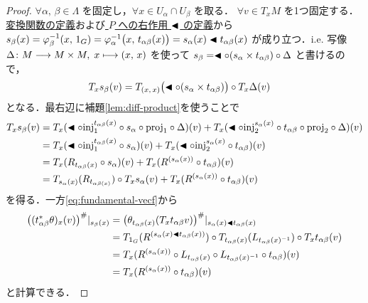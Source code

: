 \documentclass[geometry_main]{subfiles}
\begin{document}
\begin{proof}
    $\forall \alpha,\, \beta \in \Lambda$ を固定し，$\forall x \in U_\alpha \cap U_\beta$ を取る．
    $\forall v \in T_x M$ を1つ固定する．
    \hyperref[def.fiber-1]{変換関数の定義}および\hyperref[prop.PFD_right]{ $P$ への右作用 $\blacktriangleleft$ の定義}から $s_\beta (x) = \varphi_\beta^{-1}(x,\, 1_G) = \varphi_\alpha^{-1}\bigl(x,\, t_{\alpha\beta}(x)\bigr) = s_\alpha(x) \blacktriangleleft t_{\alpha\beta}(x)$ が成り立つ．i.e. \cinfty 写像 $\Delta \colon M \longrightarrow M \times M,\; x \longmapsto (x,\, x)$ を使って $s_\beta = \blacktriangleleft \circ (s_\alpha \times t_{\alpha\beta}) \circ \Delta$ と書けるので，
    \begin{align}
        T_x s_\beta (v)
        &= T_{(x,\, x)} \bigl(\blacktriangleleft \circ (s_\alpha \times t_{\alpha\beta})\bigr) \circ T_x\Delta (v)
    \end{align}
    となる．最右辺に補題\ref{lem:diff-product}を使うことで
    \begin{align}
        T_x s_\beta(v)
        &= T_x (\blacktriangleleft \circ \mathrm{inj}_1^{t_{\alpha\beta}(x)} \circ s_\alpha \circ \mathrm{proj}_1 \circ \Delta )(v)
        + T_x (\blacktriangleleft \circ \mathrm{inj}_2^{s_\alpha(x)} \circ t_{\alpha\beta} \circ \mathrm{proj}_2 \circ \Delta )(v) \\
        &= T_x (\blacktriangleleft \circ \mathrm{inj}_1^{t_{\alpha\beta}(x)} \circ s_\alpha )(v)
        + T_x (\blacktriangleleft \circ \mathrm{inj}_2^{s_\alpha(x)} \circ t_{\alpha\beta} )(v) \\
        &= T_x (R_{t_{\alpha\beta}(x)} \circ s_\alpha)(v)
        + T_x (R^{(s_\alpha(x))} \circ t_{\alpha\beta})(v) \\
        &= T_{s_\alpha(x)} (R_{t_{\alpha\beta(x)}}) \circ T_{x} s_\alpha (v)
        + T_{x} (R^{(s_\alpha(x))} \circ t_{\alpha\beta}) (v)
    \end{align}
    を得る．一方\eqref{eq:fundamental-vecf}から
    \begin{align}
        \bigl((t_{\alpha\beta}^* \theta)_x (v) \bigr)^\#|_{s_\beta(x)}
        &= \bigl( \theta_{t_{\alpha\beta}(x)}(T_{x} t_{\alpha\beta} v) \bigr)^\#|_{s_\alpha(x) \blacktriangleleft t_{\alpha\beta}(x)} \\
        &= T_{1_G} ( R^{(s_\alpha(x) \blacktriangleleft t_{\alpha\beta}(x) )} ) \circ T_{t_{\alpha\beta}(x)}(L_{t_{\alpha\beta}(x)^{-1}}) \circ T_{x} t_{\alpha\beta} (v) \\
        &= T_{x} ( R^{(s_\alpha(x))} \circ L_{t_{\alpha\beta}(x)} \circ L_{t_{\alpha\beta}(x)^{-1}} \circ t_{\alpha\beta}) (v) \\
        &= T_{x} ( R^{(s_\alpha(x))} \circ t_{\alpha\beta}) (v)
    \end{align}
    と計算できる．    
\end{proof}
\end{document}
